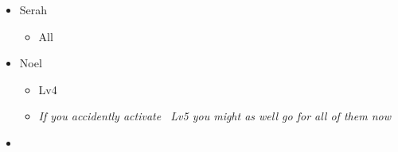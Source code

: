 \begin{menu}
  \begin{itemize}
    \crystarium
    \begin{itemize}
      \item Serah
            \begin{itemize}
              \item All \rav
            \end{itemize}
      \item Noel
            \begin{itemize}
              \item \rav Lv4
              \item \textit{If you accidently activate \rav\ Lv5 you might as well go for all of them now}
            \end{itemize}
    \end{itemize}
    \paradigm
    \begin{itemize}
      \item {}%
            {\paradigmline[1]{\textit{\com}}{\textit{\com}}{}{\X}}%
            {\paradigmline{\textit{\com}}{\com}{}{\X}}%
            {\paradigmline{\com}{\textit{\rav}}{}{\W}}%
            {\paradigmline{\sen}{\sen}{}{\W}}%
            {\paradigmline{\textit{[\rav]}}{\textit{\rav}}{}{\W}}%
            {\paradigmline{\textit{[\rav]}}{\textit{\rav}}{}{\W}}
    \end{itemize}
  \end{itemize}
\end{menu}




